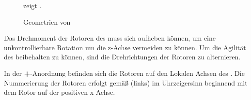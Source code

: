 \begin{figure}[ht!]
\vspace{0.25cm}
\begin{center}
\caption{Geometrien von \Quad[n] \cite{Paper1}}
\label{fig:Geom}
\end{center}

\vspace{0.25cm}
 zeigt \missing.
\end{figure}


Das Drehmoment der Rotoren des \Quad[s] muss sich aufheben können, um eine unkontrollierbare Rotation um die z-Achse vermeiden zu können. Um die Agilität des \Quad[s] beibehalten zu können, sind die Drehrichtungen der Rotoren zu alternieren.



In der \textbf{+}-Anordnung befinden sich die Rotoren auf den Lokalen Achsen des \Quad[s]. Die Nummerierung der Rotoren erfolgt gemäß  (links) im Uhrzeigersinn beginnend mit dem Rotor auf der positiven x-Achse.





\missing\












